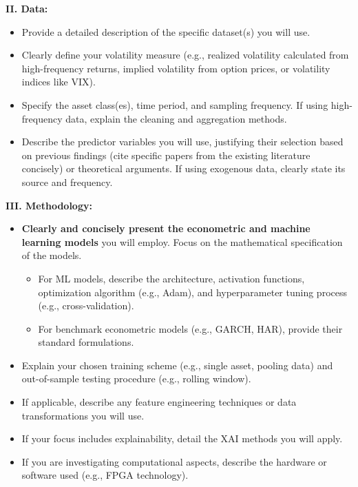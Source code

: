 \documentclass[11pt,preprint]{elsarticle}
\numberwithin{equation}{section}
\numberwithin{figure}{section}
\numberwithin{table}{section}
\def\tightlist{} %
\begin{document}
\textbf{II. Data:}

\begin{itemize}
\tightlist
\item
  Provide a detailed description of the specific dataset(s) you will
  use.
\item
  Clearly define your volatility measure (e.g., realized volatility
  calculated from high-frequency returns, implied volatility from option
  prices, or volatility indices like VIX).
\item
  Specify the asset class(es), time period, and sampling frequency. If
  using high-frequency data, explain the cleaning and aggregation
  methods.
\item
  Describe the predictor variables you will use, justifying their
  selection based on previous findings (cite specific papers from the
  existing literature concisely) or theoretical arguments. If using
  exogenous data, clearly state its source and frequency.
\end{itemize}

\textbf{III. Methodology:}

\begin{itemize}
\tightlist
\item
  \textbf{Clearly and concisely present the econometric and machine
  learning models} you will employ. Focus on the mathematical
  specification of the models.

  \begin{itemize}
  \tightlist
  \item
    For ML models, describe the architecture, activation functions,
    optimization algorithm (e.g., Adam), and hyperparameter tuning
    process (e.g., cross-validation).
  \item
    For benchmark econometric models (e.g., GARCH, HAR), provide their
    standard formulations.
  \end{itemize}
\item
  Explain your chosen training scheme (e.g., single asset, pooling data)
  and out-of-sample testing procedure (e.g., rolling window).
\item
  If applicable, describe any feature engineering techniques or data
  transformations you will use.
\item
  If your focus includes explainability, detail the XAI methods you will
  apply.
\item
  If you are investigating computational aspects, describe the hardware
  or software used (e.g., FPGA technology).
\end{itemize}
\end{document}
